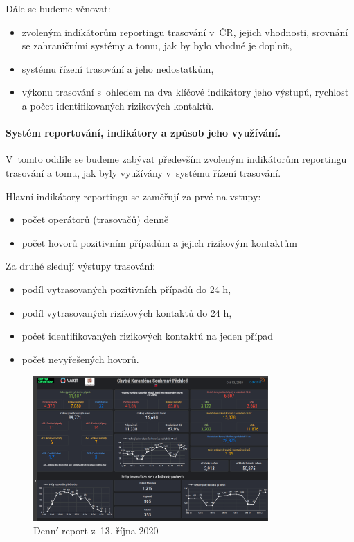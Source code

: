 Dále se budeme věnovat:
\begin{itemize}
\item zvoleným indikátorům reportingu trasování v~ČR, jejich vhodnosti, srovnání se zahraničními systémy a tomu, jak by bylo vhodné je doplnit,
\item systému řízení trasování a jeho nedostatkům,
\item výkonu trasování s~ohledem na dva klíčové indikátory jeho výstupů, rychlost a počet identifikovaných rizikových kontaktů.
\end{itemize}


\paragraph{Systém reportování, indikátory a způsob jeho využívání.} V~tomto oddíle se budeme zabývat především zvoleným indikátorům reportingu trasování a tomu, jak byly využívány v~systému řízení trasování.

Hlavní indikátory reportingu se zaměřují za prvé na vstupy:
\begin{itemize}
\item počet operátorů (trasovačů) denně
\item počet hovorů pozitivním případům a jejich rizikovým kontaktům
\end{itemize}

Za druhé sledují výstupy trasování:
\begin{itemize}
\item podíl vytrasovaných pozitivních případů do 24 h,
\item podíl vytrasovaných rizikových kontaktů do 24 h,
\item počet identifikovaných rizikových kontaktů na jeden případ
\item počet nevyřešených hovorů.
\end{itemize}

\begin{figure}[ht]
    \centering
    \includegraphics[width=0.8\textwidth]{./pic/daktela.jpg}
    \caption{Denní report z~13. října 2020}
    \label{fig:daktela}
\end{figure}



